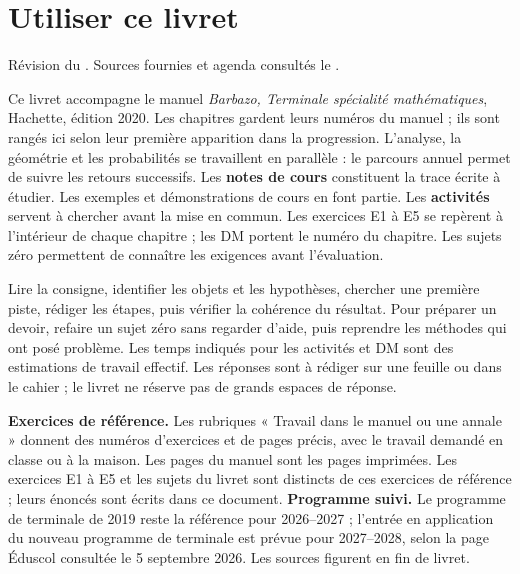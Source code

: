 \frontmatter
\chapter*{Utiliser ce livret}
Révision du . Sources fournies et agenda consultés le .

Ce livret accompagne le manuel \emph{Barbazo, Terminale spécialité mathématiques}, Hachette, édition 2020. Les chapitres gardent leurs numéros du manuel ; ils sont rangés ici selon leur première apparition dans la progression. L'analyse, la géométrie et les probabilités se travaillent en parallèle : le parcours annuel permet de suivre les retours successifs.
Les \textbf{notes de cours} constituent la trace écrite à étudier. Les exemples et démonstrations de cours en font partie. Les \textbf{activités} servent à chercher avant la mise en commun. Les exercices E1 à E5 se repèrent à l'intérieur de chaque chapitre ; les DM portent le numéro du chapitre. Les sujets zéro permettent de connaître les exigences avant l'évaluation.
\begin{keypoint}
Lire la consigne, identifier les objets et les hypothèses, chercher une première piste, rédiger les étapes, puis vérifier la cohérence du résultat. Pour préparer un devoir, refaire un sujet zéro sans regarder d'aide, puis reprendre les méthodes qui ont posé problème.
Les temps indiqués pour les activités et DM sont des estimations de travail effectif. Les réponses sont à rédiger sur une feuille ou dans le cahier ; le livret ne réserve pas de grands espaces de réponse.
\end{keypoint}
\textbf{Exercices de référence.} Les rubriques « Travail dans le manuel ou une annale » donnent des numéros d'exercices et de pages précis, avec le travail demandé en classe ou à la maison. Les pages du manuel sont les pages imprimées. Les exercices E1 à E5 et les sujets du livret sont distincts de ces exercices de référence ; leurs énoncés sont écrits dans ce document.
\textbf{Programme suivi.} Le programme de terminale de 2019 reste la référence pour 2026--2027 ; l'entrée en application du nouveau programme de terminale est prévue pour 2027--2028, selon la page Éduscol consultée le 5 septembre 2026. Les sources figurent en fin de livret.
\ifmxteacher
\mxnewpage
